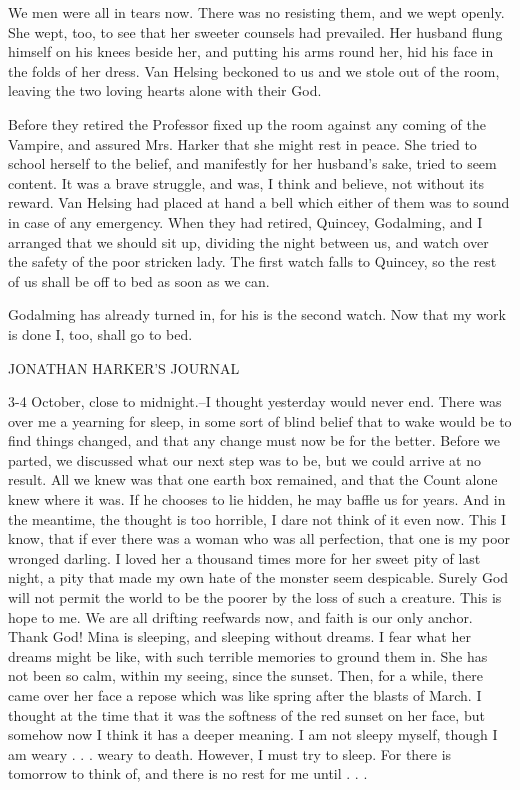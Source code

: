 We men were all in tears now. There was no resisting them, and we wept openly. She wept, too, to see that her sweeter counsels had prevailed. Her husband flung himself on his knees beside her, and putting his arms round her, hid his face in the folds of her dress. Van Helsing beckoned to us and we stole out of the room, leaving the two loving hearts alone with their God. 

Before they retired the Professor fixed up the room against any coming of the Vampire, and assured Mrs. Harker that she might rest in peace. She tried to school herself to the belief, and manifestly for her husband's sake, tried to seem content. It was a brave struggle, and was, I think and believe, not without its reward. Van Helsing had placed at hand a bell which either of them was to sound in case of any emergency. When they had retired, Quincey, Godalming, and I arranged that we should sit up, dividing the night between us, and watch over the safety of the poor stricken lady. The first watch falls to Quincey, so the rest of us shall be off to bed as soon as we can. 

Godalming has already turned in, for his is the second watch. Now that my work is done I, too, shall go to bed. 

JONATHAN HARKER'S JOURNAL 

3-4 October, close to midnight.--I thought yesterday would never end. There was over me a yearning for sleep, in some sort of blind belief that to wake would be to find things changed, and that any change must now be for the better. Before we parted, we discussed what our next step was to be, but we could arrive at no result. All we knew was that one earth box remained, and that the Count alone knew where it was. If he chooses to lie hidden, he may baffle us for years. And in the meantime, the thought is too horrible, I dare not think of it even now. This I know, that if ever there was a woman who was all perfection, that one is my poor wronged darling. I loved her a thousand times more for her sweet pity of last night, a pity that made my own hate of the monster seem despicable. Surely God will not permit the world to be the poorer by the loss of such a creature. This is hope to me. We are all drifting reefwards now, and faith is our only anchor. Thank God! Mina is sleeping, and sleeping without dreams. I fear what her dreams might be like, with such terrible memories to ground them in. She has not been so calm, within my seeing, since the sunset. Then, for a while, there came over her face a repose which was like spring after the blasts of March. I thought at the time that it was the softness of the red sunset on her face, but somehow now I think it has a deeper meaning. I am not sleepy myself, though I am weary . . . weary to death. However, I must try to sleep. For there is tomorrow to think of, and there is no rest for me until . . . 

